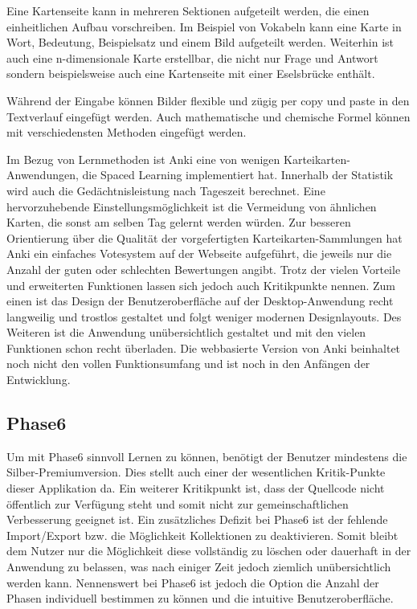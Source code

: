 Eine Kartenseite kann in mehreren Sektionen aufgeteilt werden, die einen einheitlichen Aufbau vorschreiben. Im Beispiel von Vokabeln kann eine Karte in Wort, Bedeutung, Beispielsatz und einem Bild aufgeteilt werden. Weiterhin ist auch eine n-dimensionale Karte erstellbar, die nicht nur Frage und Antwort sondern beispielsweise auch eine Kartenseite mit einer Eselsbrücke enthält.  

Während der Eingabe können Bilder flexible und zügig per copy und paste in den Textverlauf eingefügt werden. Auch mathematische und chemische Formel können mit verschiedensten Methoden eingefügt werden. 

Im Bezug von Lernmethoden ist Anki eine von wenigen Karteikarten-Anwendungen, die Spaced Learning implementiert hat. Innerhalb der Statistik wird auch die Gedächtnisleistung nach Tageszeit berechnet. Eine hervorzuhebende Einstellungsmöglichkeit ist die Vermeidung von ähnlichen Karten, die sonst am selben Tag gelernt werden würden. Zur besseren Orientierung über die Qualität der vorgefertigten Karteikarten-Sammlungen hat Anki ein einfaches Votesystem auf der Webseite aufgeführt, die jeweils nur die Anzahl der guten oder schlechten Bewertungen angibt. Trotz der vielen Vorteile und erweiterten Funktionen lassen sich jedoch auch Kritikpunkte nennen. Zum einen ist das Design der Benutzeroberfläche auf der Desktop-Anwendung recht langweilig und trostlos gestaltet und folgt weniger modernen Designlayouts. Des Weiteren ist die Anwendung unübersichtlich gestaltet und mit den vielen Funktionen schon recht überladen. Die webbasierte Version von Anki beinhaltet noch nicht den vollen Funktionsumfang und ist noch in den Anfängen der Entwicklung.

\subsection{Phase6}
Um mit Phase6 \cite{phase6} sinnvoll Lernen zu können, benötigt der Benutzer mindestens die Silber-Premiumversion. Dies stellt auch einer der wesentlichen Kritik-Punkte dieser Applikation da. Ein weiterer Kritikpunkt ist, dass der Quellcode nicht öffentlich zur Verfügung steht und somit nicht zur gemeinschaftlichen Verbesserung geeignet ist. Ein zusätzliches Defizit bei Phase6 ist der fehlende Import/Export bzw. die Möglichkeit Kollektionen zu deaktivieren. Somit bleibt dem Nutzer nur die Möglichkeit diese vollständig zu löschen oder dauerhaft in der Anwendung zu belassen, was nach einiger Zeit jedoch ziemlich unübersichtlich werden kann. Nennenswert bei Phase6 ist jedoch die Option die Anzahl der Phasen individuell bestimmen zu können und die intuitive Benutzeroberfläche.


